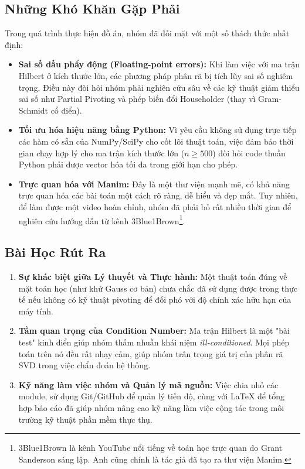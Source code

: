 \subsection{Những Khó Khăn Gặp Phải}
Trong quá trình thực hiện đồ án, nhóm đã đối mặt với một số thách thức nhất định:
\begin{itemize}
    \item \textbf{Sai số dấu phẩy động (Floating-point errors):} Khi làm việc với ma trận Hilbert ở kích thước lớn, các phương pháp phân rã bị tích lũy sai số nghiêm trọng. Điều này đòi hỏi nhóm phải nghiên cứu sâu về các kỹ thuật giảm thiểu sai số như Partial Pivoting và phép biến đổi Householder (thay vì Gram-Schmidt cổ điển).
    \item \textbf{Tối ưu hóa hiệu năng bằng Python:} Vì yêu cầu không sử dụng trực tiếp các hàm có sẵn của NumPy/SciPy cho cốt lõi thuật toán, việc đảm bảo thời gian chạy hợp lý cho ma trận kích thước lớn ($n \ge 500$) đòi hỏi code thuần Python phải được vector hóa tối đa trong giới hạn cho phép.
    \item \textbf{Trực quan hóa với Manim:} Đây là một thư viện mạnh mẽ, có khả năng trực quan hóa các bài toán một cách rõ ràng, dễ hiểu và đẹp mắt. Tuy nhiên, để làm được một video hoàn chỉnh, nhóm đã phải bỏ rất nhiều thời gian để nghiên cứu hướng dẫn từ kênh 3Blue1Brown\footnote{3Blue1Brown là kênh YouTube nổi tiếng về toán học trực quan do Grant Sanderson sáng lập. Anh cũng chính là tác giả đã tạo ra thư viện Manim.}.
\end{itemize}

\subsection{Bài Học Rút Ra}
\begin{enumerate}
    \item \textbf{Sự khác biệt giữa Lý thuyết và Thực hành:} Một thuật toán đúng về mặt toán học (như khử Gauss cơ bản) chưa chắc đã sử dụng được trong thực tế nếu không có kỹ thuật pivoting để đối phó với độ chính xác hữu hạn của máy tính.
    \item \textbf{Tầm quan trọng của Condition Number:} Ma trận Hilbert là một "bài test" kinh điển giúp nhóm thấm nhuần khái niệm \textit{ill-conditioned}. Mọi phép toán trên nó đều rất nhạy cảm, giúp nhóm trân trọng giá trị của phân rã SVD trong việc chẩn đoán hệ thống.
    \item \textbf{Kỹ năng làm việc nhóm và Quản lý mã nguồn:} Việc chia nhỏ các module, sử dụng Git/GitHub để quản lý tiến độ, cùng với LaTeX để tổng hợp báo cáo đã giúp nhóm nâng cao kỹ năng làm việc cộng tác trong môi trường kỹ thuật phần mềm thực thụ.
\end{enumerate}

